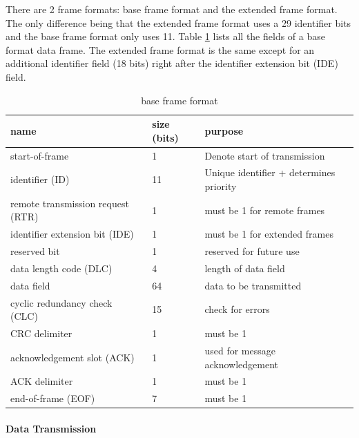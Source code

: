 \documentclass[11pt]{article}
\begin{document}
There are 2 frame formats: base frame format and the extended frame format. The only difference being that the extended frame format uses a 29 identifier bits and the base frame format only uses 11. Table \ref{table:1} lists all the fields of a base format data frame. The extended frame format is the same except for an additional identifier field (18 bits) right after the identifier extension bit (IDE) field.

\begin{table}[]
	\begin{tabular}{|l|l|l|}
		\hline
		\rowcolor[HTML]{9B9B9B} 
		name & size (bits) & purpose \\ \hline
		start-of-frame & 1 & Denote start of transmission \\ \hline
		identifier (ID) & 11 & Unique identifier + determines priority \\ \hline
		remote transmission request (RTR) & 1 & must be 1 for remote frames \\ \hline
		identifier extension bit (IDE) & 1 & must be 1 for extended frames \\ \hline
		reserved bit & 1 & reserved for future use \\ \hline
		data length code (DLC) & 4 & length of data field \\ \hline
		data field & 64 & data to be transmitted \\ \hline
		cyclic redundancy check (CLC) & 15 & check for errors \footnotemark  \\ \hline
		CRC delimiter & 1 &  must be 1 \\ \hline
		acknowledgement slot (ACK) & 1 & used for message acknowledgement \\ \hline
		ACK delimiter & 1 & must be 1 \\ \hline
		end-of-frame (EOF) & 7 & must be 1  \\ \hline
	\end{tabular}
\caption{base frame format \cite{CANwiki}}
\label{table:1}
\end{table}


\paragraph{Data Transmission}
\end{document}

